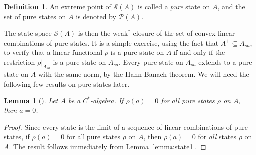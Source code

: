\documentclass[12pt,a4paper]{report}
\theoremstyle{plain}
\newtheorem{lemma}{Lemma}
\theoremstyle{definition}
\newtheorem{defn}{Definition}
\newcommand{\1}{\mathbbm{1}}
\renewcommand{\S}{\mathscr{S}}
\renewcommand{\P}[1]{\mathscr{P}(#1)}
\begin{document}
\begin{defn}
	An extreme point of $\S(A)$ is called a \emph{pure} state on $A$, and the set of pure 
	states on $A$ is denoted by $\P{A}$.
\end{defn}
The state space $\S(A)$ is then the weak$^\ast$-closure of the set of convex linear combinations of pure 
states. 
It is a simple exercise, using the fact that $A^+\subseteq A_{sa}$, to verify that a linear 
functional $\rho$ is a pure state on $A$ if and only if the restriction $\rho|_{A_{sa}}$ is a pure
state on $A_{sa}$.
Every pure state on $A_{sa}$ extends to a pure state on $A$ with the same norm, by the Hahn-Banach 
theorem. We will need the following few results on pure states later.

\begin{lemma}[{\cite[4.3.8,(i)]{kadison83}}]\label{lemma:pure1}
	Let $A$ be a $C^\ast$-algebra. If $\rho(a)=0$ for all \emph{pure} states $\rho$ on $A$, then $a=0$.
\end{lemma}
\begin{proof}
	Since every state is the limit of a sequence of linear combinations of pure states, if $\rho(a)=0$ 
	for all pure states $\rho$ on $A$, then $\rho(a)=0$ for \emph{all} states $\rho$ on $A$. The result 
	follows immediately from Lemma \ref{lemma:state1}.
\end{proof}
\end{document}
